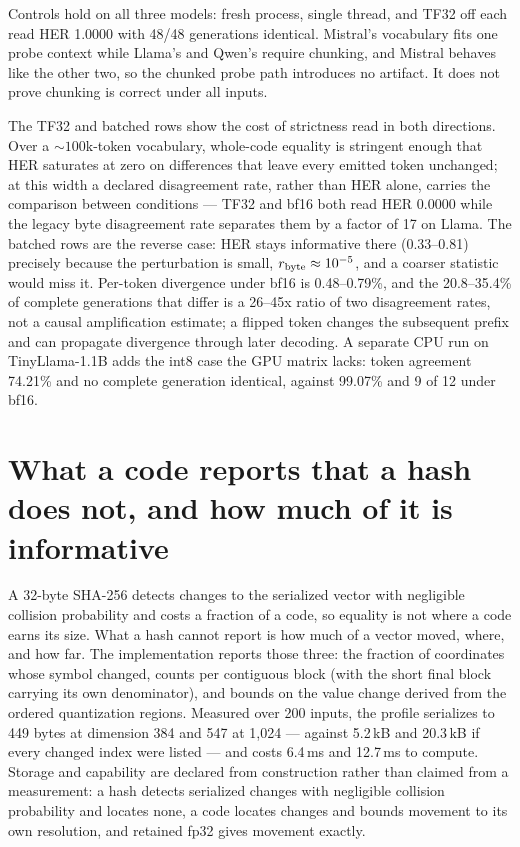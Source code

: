 \documentclass{article}
\begin{document}
Controls hold on all three models: fresh process, single thread, and TF32 off each read HER 1.0000 with 48/48 generations identical. Mistral's vocabulary fits one probe context while Llama's and Qwen's require chunking, and Mistral behaves like the other two, so the chunked probe path introduces no artifact. It does not prove chunking is correct under all inputs.

The TF32 and batched rows show the cost of strictness read in both directions. Over a ${\sim}100$k-token vocabulary, whole-code equality is stringent enough that HER saturates at zero on differences that leave every emitted token unchanged; at this width a declared disagreement rate, rather than HER alone, carries the comparison between conditions --- TF32 and bf16 both read HER 0.0000 while the legacy byte disagreement rate separates them by a factor of 17 on Llama. The batched rows are the reverse case: HER stays informative there (0.33--0.81) precisely because the perturbation is small, $r_{\rm byte}\approx10^{-5}$, and a coarser statistic would miss it. Per-token divergence under bf16 is 0.48--0.79\%, and the 20.8--35.4\% of complete generations that differ is a 26--45x ratio of two disagreement rates, not a causal amplification estimate; a flipped token changes the subsequent prefix and can propagate divergence through later decoding. A separate CPU run on TinyLlama-1.1B adds the int8 case the GPU matrix lacks: token agreement 74.21\% and no complete generation identical, against 99.07\% and 9 of 12 under bf16.

\section{What a code reports that a hash does not, and how much of it is informative}\label{app:bounds}

A 32-byte SHA-256 detects changes to the serialized vector with negligible collision probability and costs a fraction of a code, so equality is not where a code earns its size. What a hash cannot report is how much of a vector moved, where, and how far. The implementation reports those three: the fraction of coordinates whose symbol changed, counts per contiguous block (with the short final block carrying its own denominator), and bounds on the value change derived from the ordered quantization regions. Measured over 200 inputs, the profile serializes to 449 bytes at dimension 384 and 547 at 1{,}024 --- against 5.2\,kB and 20.3\,kB if every changed index were listed --- and costs 6.4\,ms and 12.7\,ms to compute. Storage and capability are declared from construction rather than claimed from a measurement: a hash detects serialized changes with negligible collision probability and locates none, a code locates changes and bounds movement to its own resolution, and retained fp32 gives movement exactly.
\end{document}
